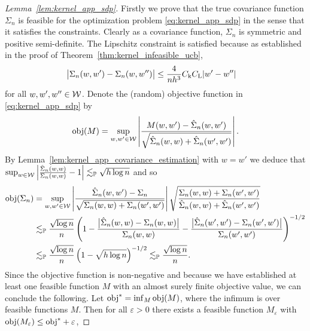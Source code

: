 \begin{proof}[Lemma~\ref{lem:kernel_app_sdp}]

  Firstly we prove that the true covariance function
  $\Sigma_n$
  is feasible for the optimization problem
  \eqref{eq:kernel_app_sdp} in the sense that it satisfies the constraints.
  Clearly as a covariance function,
  $\Sigma_n$ is symmetric and positive semi-definite.
  The Lipschitz constraint is satisfied because
  as established in the proof of
  Theorem~\ref{thm:kernel_infeasible_ucb},
  \begin{align*}
    \big|
    \Sigma_n(w,w')
    -
    \Sigma_n(w, w'')
    \big|
    &\leq
    \frac{4}{n h^3}
    C_{\mathrm{k}}
    C_{\mathrm{L}}
    |w'-w''|
  \end{align*}
  for all $w,w',w'' \in \mathcal{W}$.
  Denote the (random) objective function
  in \eqref{eq:kernel_app_sdp} by
  \begin{align*}
    \mathrm{obj}(M) = \sup_{w,w' \in \mathcal{W}}
    \left|
    \frac{M(w,w') - \hat\Sigma_n(w,w')}
    {\sqrt{\hat \Sigma_n(w,w) + \hat \Sigma_n(w',w')}}
    \right|.
  \end{align*}
  By Lemma~\ref{lem:kernel_app_covariance_estimation}
  with $w = w'$ we deduce that
  $\sup_{w \in \mathcal{W}}
  \left|\frac{\hat \Sigma_n(w,w)}{\Sigma_n(w,w)} - 1\right|
  \lesssim_{\mathbb{P}} \sqrt{h \log n}$
  and so
  \begin{align*}
    \mathrm{obj}(\Sigma_n)
    &= \sup_{w,w' \in \mathcal{W}}
    \left|
    \frac{\hat\Sigma_n(w,w') - \Sigma_n}
    {\sqrt{\Sigma_n(w,w) + \Sigma_n(w',w')}}
    \right|
    \sqrt{\frac{\Sigma_n(w,w) + \Sigma_n(w',w')}
    {\hat \Sigma_n(w,w) + \hat \Sigma_n(w',w')}} \\
    &\lesssim_{\mathbb{P}}
    \frac{\sqrt{\log n}}{n}
    \left(
      1 - \frac{\big|\hat \Sigma_n(w,w) - \Sigma_n(w,w)\big|}
      {\Sigma_n(w,w)}
      - \frac{\big|\hat \Sigma_n(w',w') - \Sigma_n(w',w')\big|}
      {\Sigma_n(w',w')}
    \right)^{-1/2} \\
    &\lesssim_{\mathbb{P}}
    \frac{\sqrt{\log n}}{n}
    \left(
      1 - \sqrt{h \log n}
    \right)^{-1/2}
    \lesssim_{\mathbb{P}}
    \frac{\sqrt{\log n}}{n}.
  \end{align*}
  Since the objective function
  is non-negative and because we have established
  at least one feasible function $M$ with
  an almost surely finite objective value,
  we can conclude the following.
  Let $\mathrm{obj}^* = \inf_M \mathrm{obj}(M)$,
  where the infimum is over feasible functions $M$.
  Then for all $\varepsilon > 0$
  there exists a feasible function $M_\varepsilon$ with
  $\mathrm{obj}(M_\varepsilon) \leq \mathrm{obj}^* + \varepsilon$,

\end{proof}
